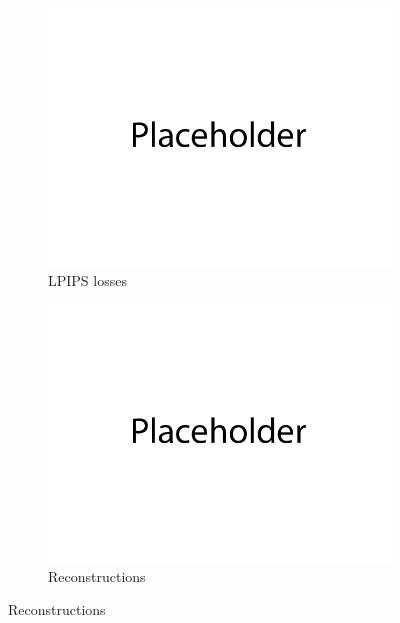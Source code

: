 \documentclass{article}
\begin{document}
\begin{figure}[H]
    \begin{subfigure}{0.4\textwidth}
        \centering
        \includegraphics[width=\textwidth]{figures/q3b_lpips_losses.png}
        \caption{LPIPS losses}
    \end{subfigure}
    \begin{subfigure}{0.6\textwidth}
        \centering
        \includegraphics[width=\textwidth]{figures/q3b_reconstructions.png}
        \caption{Reconstructions}
    \end{subfigure}
\end{figure}
\end{document}
